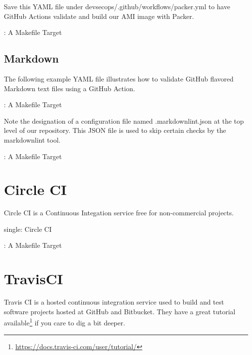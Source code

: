 Save this YAML file under devsecops/.github/workflows/packer.yml to have
GitHub Actions validate and build our AMI image with Packer.


\begin{mybox}{\thetcbcounter: A Makefile Target}
	
\end{mybox}

\subsection{Markdown}

The following example YAML file illustrates how to validate GitHub
flavored Markdown text files using a GitHub Action.

\begin{mybox}{\thetcbcounter: A Makefile Target}
	
\end{mybox}

\justify
Note the designation of a configuration file named .markdownlint.json at
the top level of our repository. This JSON file is used to skip certain
checks by the markdownlint tool.

\justify
\begin{mybox}{\thetcbcounter: A Makefile Target}
	
\end{mybox}

\section{Circle CI}

Circle CI is a Continuous Integation service free for non-commercial
projects.

single: Circle CI

\justify
\begin{mybox}{\thetcbcounter: A Makefile Target}
	
\end{mybox}

\section{TravisCI}

\justify
Travis CI is a hosted continuous integration service used to build and
test software projects hosted at GitHub and Bitbucket. They have a great
tutorial available\footnote{\url{https://docs.travis-ci.com/user/tutorial/}}
if you care to dig a bit deeper.

